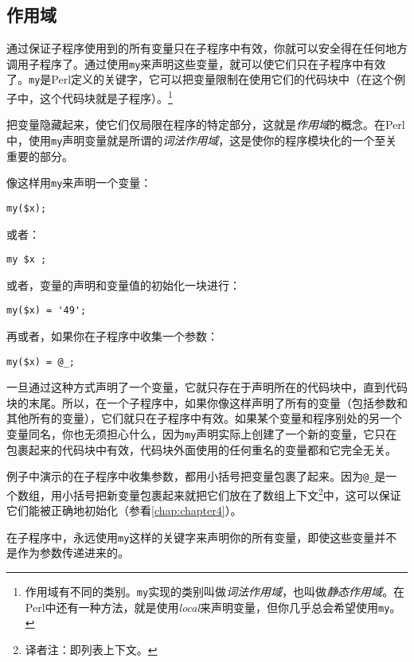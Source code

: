 \subsection{作用域}
通过保证子程序使用到的所有变量只在子程序中有效，你就可以安全得在任何地方调用子程序了。通过使用\verb|my|来声明这些变量，就可以使它们只在子程序中有效了。\verb|my|是Perl定义的关键字，它可以把变量限制在使用它们的代码块中（在这个例子中，这个代码块就是子程序）。\footnote{作用域有不同的类别。\verb|my|实现的类别叫做\textit{词法作用域}，也叫做\textit{静态作用域}。在Perl中还有一种方法，就是使用\textit{local}来声明变量，但你几乎总会希望使用\verb|my|。} 

把变量隐藏起来，使它们仅局限在程序的特定部分，这就是\textit{作用域}的概念。在Perl中，使用\verb|my|声明变量就是所谓的\textit{词法作用域}，这是使你的程序模块化的一个至关重要的部分。

像这样用\verb|my|来声明一个变量：

\begin{lstlisting}
my($x); 
\end{lstlisting}

或者：

\begin{lstlisting}
my $x ; 
\end{lstlisting}

或者，变量的声明和变量值的初始化一块进行：

\begin{lstlisting}
my($x) = '49'; 
\end{lstlisting}

再或者，如果你在子程序中收集一个参数：

\begin{lstlisting}
my($x) = @_; 
\end{lstlisting}

一旦通过这种方式声明了一个变量，它就只存在于声明所在的代码块中，直到代码块的末尾。所以，在一个子程序中，如果你像这样声明了所有的变量（包括参数和其他所有的变量），它们就只在子程序中有效。如果某个变量和程序别处的另一个变量同名，你也无须担心什么，因为\verb|my|声明实际上创建了一个新的变量，它只在包裹起来的代码块中有效，代码块外面使用的任何重名的变量都和它完全无关。

例子中演示的在子程序中收集参数，都用小括号把变量包裹了起来。因为\verb|@_|是一个数组，用小括号把新变量包裹起来就把它们放在了数组上下文\footnote{译者注：即列表上下文。}中，这可以保证它们能被正确地初始化（参看\autoref{chap:chapter4}）。

\begin{adjustwidth}{2cm}{2cm}
\noindent
在子程序中，永远使用\verb|my|这样的关键字来声明你的所有变量，即使这些变量并不是作为参数传递进来的。
\end{adjustwidth}

